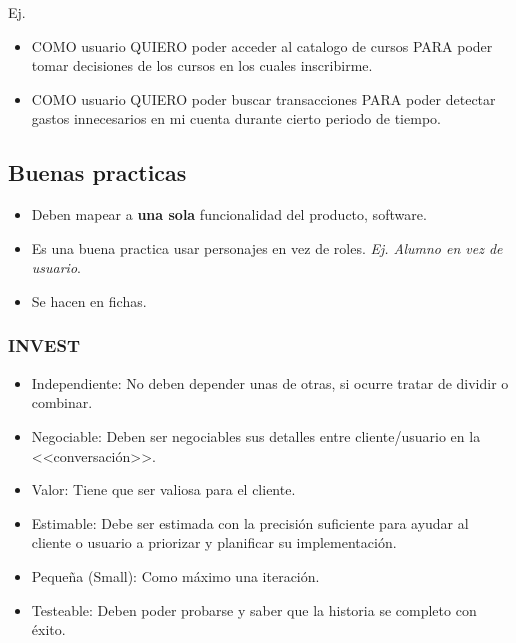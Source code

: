 \documentclass[titlepage,a4paper]{article}
\begin{document}
Ej. 
\begin{itemize}
    \item COMO usuario QUIERO poder acceder al catalogo de cursos PARA poder tomar decisiones de los cursos en los cuales inscribirme.
    \item COMO usuario QUIERO poder buscar transacciones PARA poder detectar gastos innecesarios en mi cuenta durante cierto periodo de tiempo.
\end{itemize}

\subsection*{Buenas practicas}
\begin{itemize}
    \item Deben mapear a \textbf{una sola} funcionalidad del producto, software.
    \item Es una buena practica usar personajes en vez de roles. \textit{Ej. Alumno en vez de usuario}.
    \item Se hacen en fichas.
\end{itemize}

\subsubsection*{INVEST}
\begin{itemize}
    \item Independiente: No deben depender unas de otras, si ocurre tratar de dividir o combinar.
    \item Negociable: Deben ser negociables sus detalles entre cliente/usuario en la <<conversación>>.
    \item Valor: Tiene que ser valiosa para el cliente.
    \item Estimable: Debe ser estimada con la precisión suficiente para ayudar al cliente o usuario a priorizar y planificar su implementación.
    \item Pequeña (Small): Como máximo una iteración.
    \item Testeable: Deben poder probarse y saber que la historia se completo con éxito.
\end{itemize}
\end{document}
